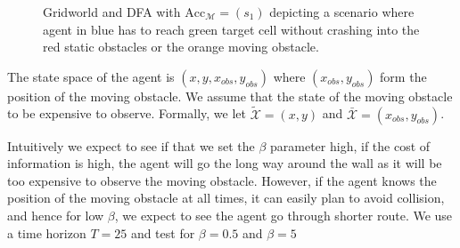 \begin{figure}
{
}
\caption{Gridworld and DFA  with $\textrm{Acc}_{\mathcal{M}} = (s_1)$ depicting a scenario where agent in blue has to reach green target cell without crashing into the red static obstacles or the orange moving obstacle.}\label{fig:casestudy}
\end{figure}

The state space of the agent is $(x,y,x_{obs},y_{obs})$ where $(x_{obs},y_{obs})$ form the position of the moving obstacle. We assume that the state of the moving obstacle to be expensive to observe. Formally, we let $\mathcal{\tilde{X}} = (x,y)$ and $\mathcal{\bar{X}} = (x_{obs},y_{obs})$. 

 Intuitively we expect to see if that we set the $\beta$ parameter high, \ie if the cost of information is high, the agent will go the long way around the wall as it will be too expensive to observe the moving obstacle. However, if the agent knows the position of the moving obstacle at all times, it can easily plan to avoid collision, and hence for low $\beta$, we expect to see the agent go through shorter route. We use a time horizon $T = 25$ and test for $\beta = 0.5$ and $\beta=5$

